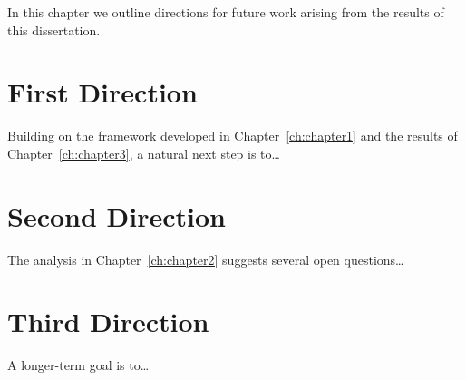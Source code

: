 
In this chapter we outline directions for future work arising from
the results of this dissertation.

\section{First Direction}

Building on the framework developed in Chapter~\ref{ch:chapter1}
and the results of Chapter~\ref{ch:chapter3}, a natural next step
is to\ldots

\section{Second Direction}

The analysis in Chapter~\ref{ch:chapter2} suggests several open
questions\ldots

\section{Third Direction}

A longer-term goal is to\ldots

